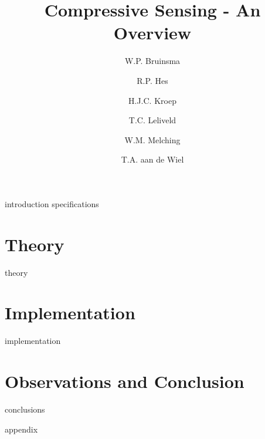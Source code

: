 \documentclass[a4paper, openany, oneside, report]{memoir}
\title{Compressive Sensing - An Overview}
\author{W.P. Bruinsma \and R.P. Hes \and H.J.C. Kroep \and T.C. Leliveld \and W.M. Melching \and T.A. aan de Wiel}
\begin{document}
\frontmatter

\begin{titlingpage}
  \pagestyle{empty}
  \maketitle
\end{titlingpage}


\tableofcontents

\mainmatter
{introduction}
{specifications}


\part{Theory}
\label{prt:theory}
{theory}
\part{Implementation}
\label{prt:implementation}
{implementation}


\part{Observations and Conclusion}
{conclusions}

{}
\printbibliography

{appendix}
\end{document}
